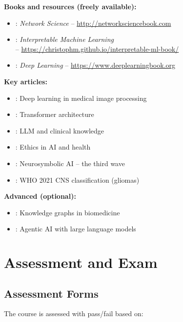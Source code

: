 \documentclass[11pt,a4paper]{article}
\begin{document}
\textbf{Books and resources (freely available):}
\begin{itemize}[nosep]
    \item \citet{barabasi2016network}: \emph{Network Science} -- \url{http://networksciencebook.com}
    \item \citet{molnar2022interpretable}: \emph{Interpretable Machine Learning} \\ -- \url{https://christophm.github.io/interpretable-ml-book/}
    \item \citet{goodfellow2016deep}: \emph{Deep Learning} -- \url{https://www.deeplearningbook.org}
\end{itemize}

\textbf{Key articles:}
\begin{itemize}[nosep]
    \item \citet{lundervold2019overview}: Deep learning in medical image processing
    \item \citet{vaswani2017attention}: Transformer architecture
    \item \citet{singhal2023large}: LLM and clinical knowledge
    \item \citet{morley2020ethics}: Ethics in AI and health
    \item \citet{garcez2020neurosymbolic}: Neurosymbolic AI -- the third wave
    \item \citet{louis2021who}: WHO 2021 CNS classification (gliomas)
\end{itemize}

\textbf{Advanced (optional):}
\begin{itemize}[nosep]
    \item \citet{nicholson2020knowledge}: Knowledge graphs in biomedicine
    \item \citet{xi2023rise}: Agentic AI with large language models
\end{itemize}

\section{Assessment and Exam}

\subsection{Assessment Forms}

The course is assessed with pass/fail based on:
\end{document}
